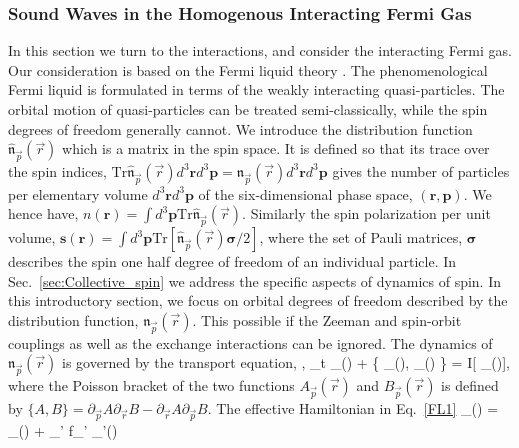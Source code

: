\subsubsection{Sound Waves in the Homogenous Interacting Fermi Gas} 
In this section we turn to the interactions, and consider the interacting Fermi gas.
Our consideration is based on the Fermi liquid theory \cite{Pines1966}.
The phenomenological Fermi liquid is formulated in terms of the weakly interacting quasi-particles. 
The orbital motion of quasi-particles can be treated semi-classically, while the spin degrees of freedom generally cannot.
We introduce the distribution function $\hat{\mathfrak{n}}_{\vec{p}}(\vec{r})$  which is a matrix in the spin space.
It is defined so that its trace over the spin indices, $\mathrm{Tr} \hat{\mathfrak{n}}_{\vec{p}}(\vec{r}) d^3 \bm{r} d^3 \bm{p} = \mathfrak{n}_{\vec{p}}(\vec{r}) d^3 \bm{r} d^3 \bm{p}$ gives the number of particles per elementary volume $d^3 \bm{r} d^3 \bm{p}$ of the six-dimensional phase space, $(\bm{r},\bm{p})$.
We hence have, $n(\bm{r}) = \int d^3 \bm{p} \mathrm{Tr} \hat{\mathfrak{n}}_{\vec{p}}(\vec{r})$.
Similarly the spin polarization per unit volume, $\bm{s}(\bm{r}) = \int d^3 \bm{p} \mathrm{Tr} [\hat{\mathfrak{n}}_{\vec{p}}(\vec{r})\bm{\sigma}/2]$, where the set of Pauli matrices, $\bm{\sigma}$ describes the spin one half degree of freedom of an individual particle.
In Sec.~\ref{sec:Collective_spin} we address the specific aspects of dynamics of spin.
In this introductory section, we focus on orbital degrees of freedom described by the distribution function, $\mathfrak{n}_{\vec{p}}(\vec{r})$.
This possible if the Zeeman and spin-orbit couplings as well as the exchange interactions can be ignored.
The dynamics of $\mathfrak{n}_{\vec{p}}(\vec{r})$ is governed by the transport equation, \cite{Pines1966,Pitaevskii1980},
\be\label{FL1}
\partial_t _{}()  + 
\{ \tilde{\epsilon}_{}(), _{}() \} = I[ _{}()], 
\ee
where the Poisson bracket of the two functions $A_{\vec{p}}(\vec{r})$
and $B_{\vec{p}}(\vec{r})$ is defined by $\{ A, B\} = \partial_{\vec{p}} A \partial_{\vec{r}} B -
\partial_{\vec{r}} A \partial_{\vec{p}} B$.
The effective Hamiltonian  in Eq.~\eqref{FL1} 
\be\label{FL3}
\tilde{\epsilon}_{}() = \epsilon_{}() + \sum_{'} f_{'} \delta {}_{'}()
